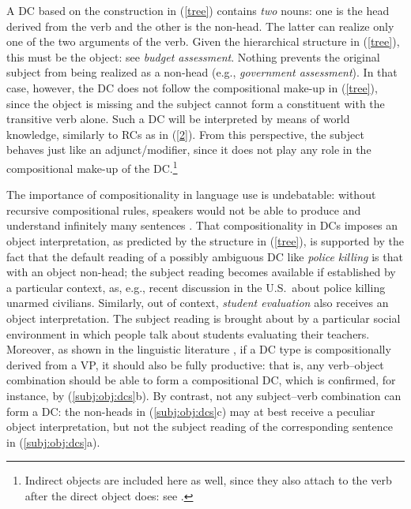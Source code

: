 \documentclass[output=paper]{langsci/langscibook}
\begin{document}
\begin{exe}
\end{exe}

 {A DC based on the construction  in (\ref{tree}) contains \textit{two} nouns: one is the head derived from the verb and the other is the non-head. The latter can realize only one of the two arguments of the verb. Given the hierarchical structure in (\ref{tree}), this must be the object: see \textit{budget assessment}. Nothing prevents the original subject from being realized as a non-head (e.g., \textit{government assessment}). In that case, however, the DC does not follow the compositional make-up in (\ref{tree}), since the object is missing and the subject cannot form a constituent with the transitive verb alone. Such a DC will be interpreted by means of world knowledge, similarly to RCs as in (\ref{2}). From this perspective, the  subject behaves just like an adjunct/modifier, since it does not play any role in the compositional make-up of the DC.}\footnote{Indirect objects are included here as well, since they also attach to the verb after the direct object does: see \cite{larson:88}.}

 The importance of compositionality in language use is undebatable: without recursive compositional rules, speakers would not be able to produce and understand infinitely many sentences \citep{dowty:07}. That compositionality in DCs imposes an object interpretation, as predicted by the structure in (\ref{tree}), is supported by the fact that the default reading of a possibly ambiguous DC like \textit{police killing} is that with an object non-head; the subject reading becomes available if established by a particular context, as, e.g., recent discussion in the U.S.\ about police killing unarmed civilians. Similarly, out of context, \textit{student evaluation} also receives an object interpretation. The subject reading is brought about by a particular social environment in which people talk about students evaluating their teachers. Moreover, as shown in the linguistic literature  \citep{grimshaw:90,borer:13,iordachioaia:alexiadou:pairamidis:17}, if a DC type is  compositionally derived from a VP, it should also be fully productive: that is, any verb--object combination should be able to form a compositional DC, which is confirmed, for instance, by (\ref{subj:obj:dcs}b). By contrast, not any subject--verb combination can form a DC: the non-heads in  (\ref{subj:obj:dcs}c) may at best receive a peculiar object interpretation, but not the subject reading of the corresponding sentence in (\ref{subj:obj:dcs}a).
\end{document}
